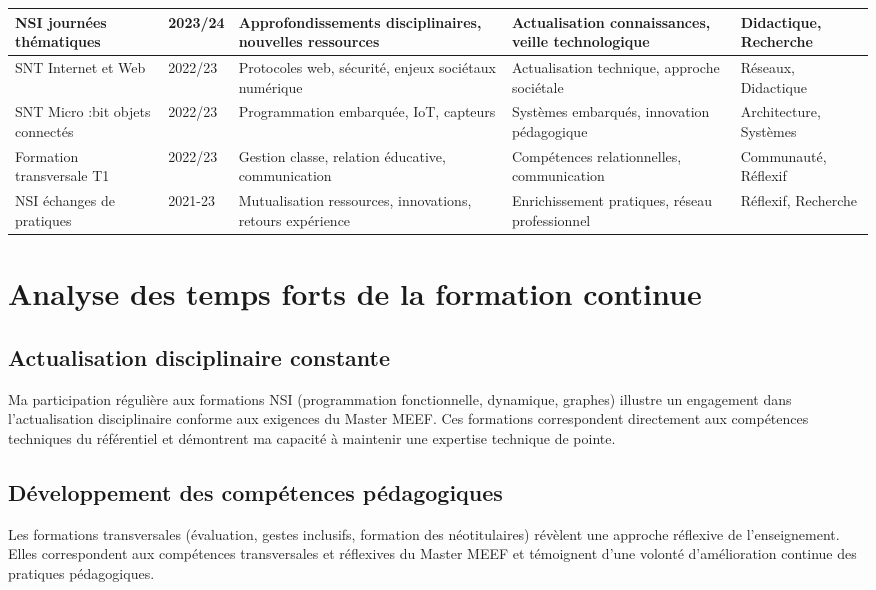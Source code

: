 \begin{center}
\begin{tabular}{|p{2.5cm}|p{1cm}|p{2.5cm}|p{2.5cm}|p{2.5cm}|}
\hline
NSI journées thématiques & 2023/24 & Approfondissements disciplinaires, nouvelles ressources & Actualisation connaissances, veille technologique & Didactique, Recherche \\
\hline
SNT Internet et Web & 2022/23 & Protocoles web, sécurité, enjeux sociétaux numérique & Actualisation technique, approche sociétale & Réseaux, Didactique \\
\hline
SNT Micro :bit objets connectés & 2022/23 & Programmation embarquée, IoT, capteurs & Systèmes embarqués, innovation pédagogique & Architecture, Systèmes \\
\hline
Formation transversale T1 & 2022/23 & Gestion classe, relation éducative, communication & Compétences relationnelles, communication & Communauté, Réflexif \\
\hline
NSI échanges de pratiques & 2021-23 & Mutualisation ressources, innovations, retours expérience & Enrichissement pratiques, réseau professionnel & Réflexif, Recherche \\
\hline
\end{tabular}
\end{center}

\section{Analyse des temps forts de la formation continue}

\subsection{Actualisation disciplinaire constante}

Ma participation régulière aux formations NSI (programmation fonctionnelle, dynamique, graphes) illustre un engagement dans l'actualisation disciplinaire conforme aux exigences du Master MEEF. Ces formations correspondent directement aux compétences techniques du référentiel et démontrent ma capacité à maintenir une expertise technique de pointe.

\subsection{Développement des compétences pédagogiques}

Les formations transversales (évaluation, gestes inclusifs, formation des néotitulaires) révèlent une approche réflexive de l'enseignement. Elles correspondent aux compétences transversales et réflexives du Master MEEF et témoignent d'une volonté d'amélioration continue des pratiques pédagogiques.

